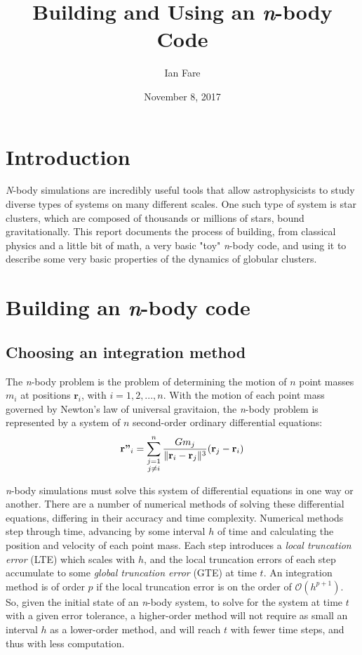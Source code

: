 \documentclass{article}
\title{Building and Using an \textit{n}-body Code}
\author{Ian Fare}
\date{November 8, 2017}
\DeclarePairedDelimiter{\norm}{\lVert}{\rVert}
\begin{document}
\maketitle

\section{Introduction}

\textit{N}-body simulations are incredibly useful tools that allow astrophysicists to study diverse types of systems on many different scales. One such type of system is star clusters, which are composed of thousands or millions of stars, bound gravitationally. This report documents the process of building, from classical physics and a little bit of math, a very basic "toy" \textit{n}-body code, and using it to describe some very basic properties of the dynamics of globular clusters.

\section{Building an \textit{n}-body code}

\subsection{Choosing an integration method}

The \textit{n}-body problem is the problem of determining the motion of $n$ point masses $m_i$ at positions $\textbf{r}_i$, with $i=1,2,...,n$. With the motion of each point mass governed by Newton's law of universal gravitaion, the \textit{n}-body problem is represented by a system of $n$ second-order ordinary differential equations:
\begin{equation}
    \textbf{r''}_i = \sum_{\substack{j=1\\j\neq i}}^n \frac{Gm_j}{\norm{\textbf{r}_i-\textbf{r}_j}^3}(\textbf{r}_j-\textbf{r}_i)
\end{equation}

\textit{n}-body simulations must solve this system of differential equations in one way or another. There are a number of numerical methods of solving these differential equations, differing in their accuracy and time complexity. Numerical methods step through time, advancing by some interval $h$ of time and calculating the position and velocity of each point mass. Each step introduces a \textit{local truncation error} (LTE) which scales with $h$, and the local truncation errors of each step accumulate to some \textit{global truncation error} (GTE) at time $t$. An integration method is of order $p$ if the local truncation error is on the order of $\mathcal{O}(h^{p+1})$. So, given the initial state of an \textit{n}-body system, to solve for the system at time $t$ with a given error tolerance, a higher-order method will not require as small an interval $h$ as a lower-order method, and will reach $t$ with fewer time steps, and thus with less computation. 
\end{document}
